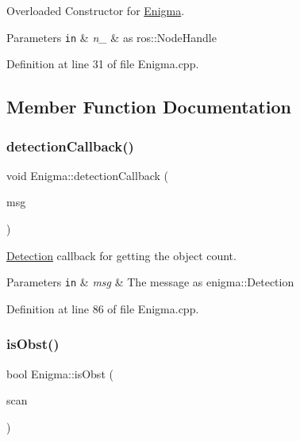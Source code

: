 Overloaded Constructor for \hyperlink{class_enigma}{Enigma}. 


\begin{DoxyParams}[1]{Parameters}
\mbox{\tt in}  & {\em n\+\_\+} & as ros\+::\+Node\+Handle \\
\hline
\end{DoxyParams}


Definition at line 31 of file Enigma.\+cpp.



\subsection{Member Function Documentation}
\mbox{\label{class_enigma_a468f2a08dbf08c32b055b0c3bae63dc7}} 
\subsubsection{\texorpdfstring{detection\+Callback()}{detectionCallback()}}
{\footnotesize\ttfamily void Enigma\+::detection\+Callback (\begin{DoxyParamCaption}\item[{const enigma\+::\+Detection \&}]{msg }\end{DoxyParamCaption})}



\hyperlink{class_detection}{Detection} callback for getting the object count. 


\begin{DoxyParams}[1]{Parameters}
\mbox{\tt in}  & {\em msg} & The message as enigma\+::\+Detection \\
\hline
\end{DoxyParams}


Definition at line 86 of file Enigma.\+cpp.

\mbox{\label{class_enigma_af7d2843462441eb80555ba36d4f31401}} 
\subsubsection{\texorpdfstring{is\+Obst()}{isObst()}}
{\footnotesize\ttfamily bool Enigma\+::is\+Obst (\begin{DoxyParamCaption}\item[{const sensor\+\_\+msgs\+::\+Laser\+Scan \&}]{scan }\end{DoxyParamCaption})}



